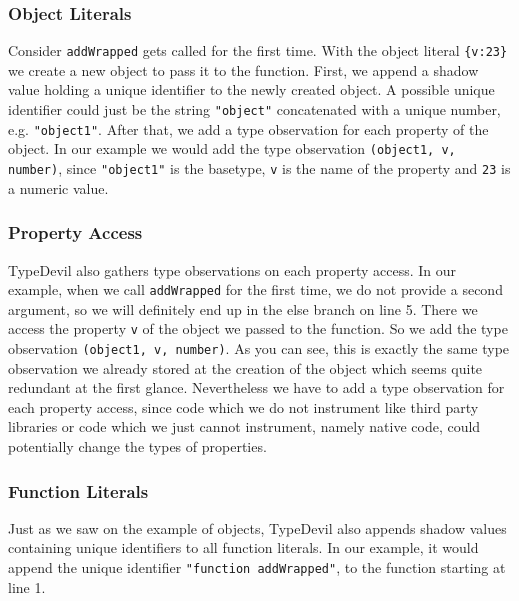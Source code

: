 \documentclass[runningheads,a4paper]{llncs}
\begin{document}
\subsubsection{Object Literals}
Consider \lstinline[columns=fixed]{addWrapped} gets called for the first time.
With the object literal \lstinline[columns=fixed]!{v:23}! we create a new object to pass it to the function.
First, we append a shadow value holding a unique identifier to the newly created object. A possible unique identifier could just be the string \lstinline[columns=fixed]{"object"} concatenated with a unique number, e.g. \lstinline[columns=fixed]{"object1"}.
After that, we add a type observation for each property of the object.
In our example we would add the type observation \lstinline[columns=fixed]{(object1, v, number)}, since \lstinline[columns=fixed]{"object1"} is the basetype, \lstinline[columns=fixed]{v} is the name of the property and \lstinline[columns=fixed]{23} is a numeric value.

\subsubsection{Property Access}
TypeDevil also gathers type observations on each property access.
In our example, when we call \lstinline[columns=fixed]{addWrapped} for the first time, we do not provide a second argument, so we will definitely end up in the else branch on line 5. 
There we access the property \lstinline[columns=fixed]{v} of the object we passed to the function.
So we add the type observation \lstinline[columns=fixed]{(object1, v, number)}.
As you can see, this is exactly the same type observation we already stored at the creation of the object which seems quite redundant at the first glance. 
Nevertheless we have to add a type observation for each property access, since code which we do not instrument like third party libraries or code which we just cannot instrument, namely native code, could potentially change the types of properties.

\subsubsection{Function Literals}
Just as we saw on the example of objects, TypeDevil also appends shadow values containing unique identifiers to all function literals.
In our example, it would append the unique identifier \lstinline[columns=fixed]{"function addWrapped"}, to the function starting at line 1.
\end{document}
